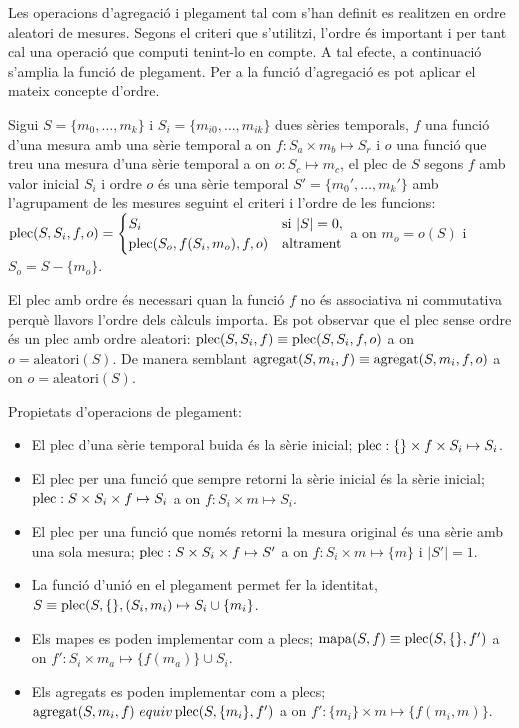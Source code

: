 Les operacions d'agregació i plegament tal com s'han definit es
realitzen en ordre aleatori de mesures. Segons el criteri que
s'utilitzi, l'ordre és important i per tant cal una operació que
computi tenint-lo en compte. A tal efecte, a continuació s'amplia la
funció de plegament. Per a la funció d'agregació es pot aplicar el
mateix concepte d'ordre.
\begin{definition}
  Sigui $S=\{m_0, \dotsc, m_k\}$ i $S_i=\{m_{i0}, \dotsc, m_{ik}\}$
  dues sèries temporals, $f$ una funció d'una mesura amb una sèrie
  temporal a on $f: S_a \times m_b \mapsto S_r$ i $o$ una funció que
  treu una mesura d'una sèrie temporal a on $o: S_c \mapsto m_c$, el
  plec de $S$ segons $f$ amb valor inicial $S_i$ i ordre $o$ és una
  sèrie temporal $S'= \{m_0', \dotsc, m_k'\}$ amb l'agrupament de les
  mesures seguint el criteri i l'ordre de les funcions:
  $\operatorname*{plec}(S,S_i,f,o) =
  \begin{cases}
    S_i & \text{si } |S|=0, \\
    \operatorname*{plec}(S_o,f(S_i,m_o),f,o) & \text{altrament}
  \end{cases}$ a on $m_o = o(S)$ i $S_o = S - \{m_o\}$.
\end{definition}

El plec amb ordre és necessari quan la funció $f$ no és associativa ni
commutativa perquè llavors l'ordre dels càlculs importa. Es pot
observar que el plec sense ordre és un plec amb ordre aleatori:
$\operatorname*{plec}(S,S_i,f)\equiv \operatorname*{plec}(S,S_i,f,o)$ a on $o=\text{aleatori}(S)$.
De manera semblant $\operatorname*{agregat}(S,m_i,f)\equiv \operatorname*{agregat}(S,m_i,f,o)$ a on
$o=\text{aleatori}(S)$.



Propietats d'operacions de plegament:
\begin{itemize}
\item El plec d'una sèrie temporal buida és la sèrie inicial; $\operatorname*{plec}:
  \{\} \times f \times S_i \mapsto S_i$.

\item El plec per una funció que sempre retorni la sèrie inicial és la
  sèrie inicial; $\operatorname*{plec}: S \times S_i \times f \mapsto S_i$ a on
  $f: S_i \times m \mapsto S_i$.

\item El plec per una funció que només retorni la mesura original és
  una sèrie amb una sola mesura; $\operatorname*{plec}: S \times S_i \times f \mapsto
  S'$ a on $f:S_i\times m \mapsto \{m\}$ i $|S'|=1$.


\item La funció d'unió en el plegament permet fer la identitat, $S
  \equiv \operatorname*{plec}(S,\{\},(S_i,m_i) \mapsto S_i \cup \{m_i\}$.


\item Els mapes es poden implementar com a plecs; $\operatorname*{mapa}(S,f) \equiv
  \operatorname*{plec}(S,\{\},f')$ a on $f': S_i \times m_a \mapsto \{f(m_a)\}
  \cup S_i$.

\item Els agregats es poden implementar com a plecs; $\operatorname*{agregat}(S,m_i,f) \
  equiv \operatorname*{plec}(S,\{m_i\},f')$ a on $f': \{m_i\} \times m \mapsto
  \{f(m_i,m)\}$.

\end{itemize}


